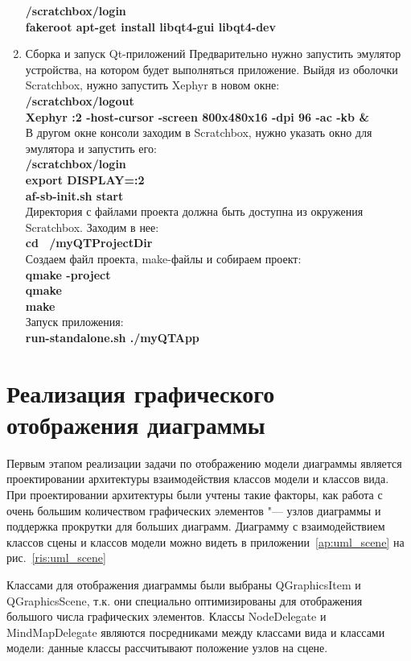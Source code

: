 \begin{enumerate}
\textbf{/scratchbox/login\\
fakeroot apt-get install libqt4-gui libqt4-dev}
\item
Сборка и запуск Qt-приложений
Предварительно нужно запустить эмулятор устройства, на котором будет выполняться приложение.
Выйдя из оболочки Scratchbox, нужно запустить Xephyr в новом окне:\\
\textbf{/scratchbox/logout\\
Xephyr :2 -host-cursor -screen 800x480x16 -dpi 96 -ac -kb \&}\\
В другом окне консоли заходим в Scratchbox, нужно указать окно для эмулятора и запустить его:\\
\textbf{/scratchbox/login\\
export DISPLAY=:2\\
af-sb-init.sh start}\\
Директория с файлами проекта должна быть доступна из окружения Scratchbox. Заходим в нее:\\
\textbf{cd ~/myQTProjectDir}\\
Создаем файл проекта, make-файлы и собираем проект:\\
\textbf{qmake -project\\
qmake\\
make}\\
Запуск приложения:\\
\textbf{run-standalone.sh ./myQTApp}
\end{enumerate}

\section{Реализация графического отображения диаграммы}

Первым этапом реализации задачи по отображению модели диаграммы является проектировании архитектуры взаимодействия классов модели и классов вида.
При проектировании архитектуры были учтены такие факторы, как работа с очень большим количеством графических элементов "--- узлов диаграммы и поддержка прокрутки для больших диаграмм. Диаграмму с взаимодействием классов сцены и классов модели можно видеть в приложении~\ref{ap:uml_scene} на рис.~\ref{ris:uml_scene}

Классами для отображения диаграммы были выбраны QGraphicsItem и
QGraphicsScene, т.к. они специально оптимизированы для отображения большого числа графических элементов. Классы NodeDelegate и MindMapDelegate являются посредниками между классами вида и классами модели: данные классы рассчитывают положение узлов на сцене.

